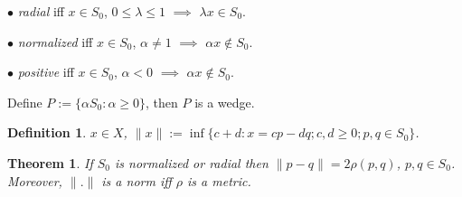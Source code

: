 \documentclass[12pt,letterpaper]{article}
\newtheorem{theorem}[lemma]{Theorem}
\newtheorem{definition}[lemma]{Definition}
\begin{document}
$\bullet$ \emph{radial} iff $x\in S_0$, $0\leq \lambda \leq 1$ $\implies$ $\lambda x\in S_0$.

$\bullet$ \emph{normalized} iff $x\in S_0$, $\alpha \neq 1$ $\implies$ $\alpha x\notin S_0$.

$\bullet$ \emph{positive} iff $x\in S_0$, $\alpha<0$ $\implies$ $\alpha x\notin S_0$.

Define $P:=\{ \alpha S_0: \alpha \geq 0\}$, then $P$ is a wedge.


\begin{definition}\label{de: basenorm} $x\in X$, $\|x\|:=\inf\{ c+d: x=cp-dq; c,d\geq 0; p,q\in S_0\}$.
\end{definition}

\begin{theorem} If $S_0$ is normalized or radial then $\|p-q\|=2\rho(p,q)$, $p,q\in S_0$. Moreover, $\|.\|$ is a norm iff $\rho$ is a metric.
\end{theorem}
\end{document}
